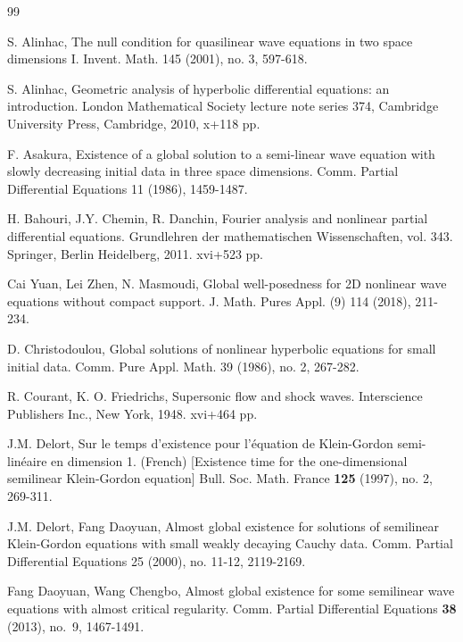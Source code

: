 \documentclass[11pt,twoside]{article}
\theoremstyle{plain}
\theoremstyle{definition}
\theoremstyle{assumption}
\numberwithin{equation}{section}
\begin{document}
\begin{thebibliography}{99}
		
 S. Alinhac, The null condition for quasilinear wave equations in two space dimensions I.
Invent. Math. 145 (2001), no. 3, 597-618.
		

 S. Alinhac, Geometric analysis of hyperbolic differential equations: an introduction.
London Mathematical Society lecture note series 374, Cambridge University Press, Cambridge, 2010, x+118 pp.
		
		 F. Asakura, Existence of a global solution to a semi-linear wave equation with slowly
		decreasing initial data in three space dimensions. Comm. Partial Differential Equations 11 (1986), 1459-1487.
		
		
		 H. Bahouri, J.Y. Chemin, R. Danchin, Fourier analysis and nonlinear partial differential equations.
 Grundlehren der mathematischen Wissenschaften, vol. 343. Springer, Berlin Heidelberg, 2011. xvi+523 pp.
		
		 Cai Yuan, Lei Zhen, N. Masmoudi, Global well-posedness for 2D nonlinear wave equations without compact support.
		J. Math. Pures Appl. (9) 114 (2018), 211-234.
		
		 D. Christodoulou, Global solutions of nonlinear hyperbolic equations for small initial data.
		Comm. Pure Appl. Math. 39 (1986), no. 2, 267-282.
		
		 R. Courant, K. O. Friedrichs, Supersonic flow and shock waves.
		Interscience Publishers Inc., New York, 1948. xvi+464 pp.

		
		 J.M. Delort, Sur le temps d'existence pour l'\'{e}quation de Klein-Gordon semi-lin\'{e}aire en dimension 1.
(French) [Existence time for the one-dimensional semilinear Klein-Gordon equation] Bull. Soc. Math. France \textbf{125} (1997),
no. 2, 269-311.



 J.M. Delort, Fang Daoyuan, Almost global existence for solutions of semilinear Klein-Gordon equations with small weakly decaying Cauchy data. Comm. Partial Differential Equations 25 (2000), no. 11-12, 2119-2169.

		
		
		 Fang Daoyuan, Wang Chengbo, Almost global existence for some semilinear wave
equations with almost critical regularity. Comm. Partial Differential Equations {\bf 38} (2013), no.~9, 1467-1491.
		

\end{thebibliography}
\end{document}
